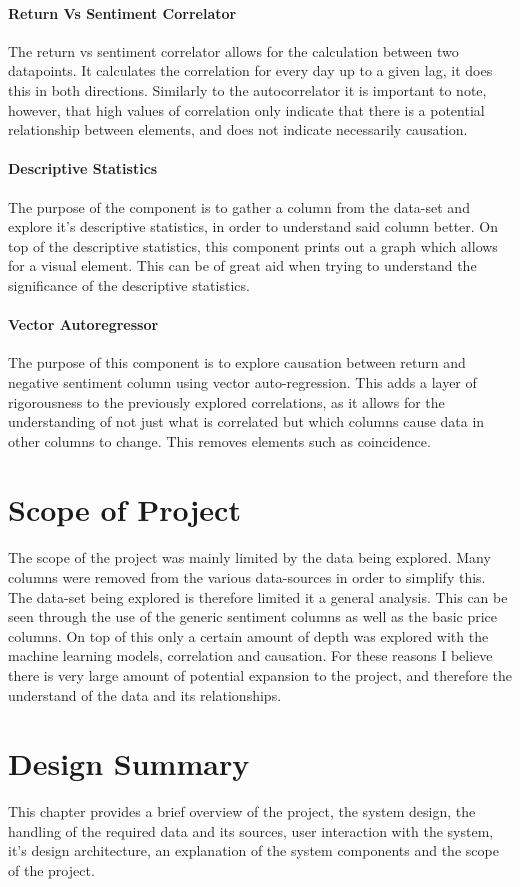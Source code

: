 \paragraph{Return Vs Sentiment Correlator}

The return vs sentiment correlator allows for the calculation between two datapoints. It calculates the correlation for every day up to a given lag, it does this in both directions. Similarly to the autocorrelator it is important to note, however, that high values of correlation only indicate that there is a potential relationship between elements, and does not indicate necessarily causation.

\paragraph{Descriptive Statistics}

The purpose of the component is to gather a column from the data-set and explore it's descriptive statistics, in order to understand said column better. On top of the descriptive statistics, this component prints out a graph which allows for a visual element. This can be of great aid when trying to understand the significance of the descriptive statistics.

\paragraph{Vector Autoregressor}

The purpose of this component is to explore causation between return and negative sentiment column using vector auto-regression. This adds a layer of rigorousness to the previously explored correlations, as it allows for the understanding of not just what is correlated but which columns cause data in other columns to change. This removes elements such as coincidence.

\section{Scope of Project}

The scope of the project was mainly limited by the data being explored. Many columns were removed from the various data-sources in order to simplify this. The data-set being explored is therefore limited it a general analysis. This can be seen through the use of the generic sentiment columns as well as the basic price columns. On top of this only a certain amount of depth was explored with the machine learning models, correlation and causation. For these reasons I believe there is very large amount of potential expansion to the project, and therefore the understand of the data and its relationships.

\section{Design Summary}

This chapter provides a brief overview of the project, the system design, the handling of the required data and its sources, user interaction with the system, it's design architecture, an explanation of the system components and the scope of the project.
